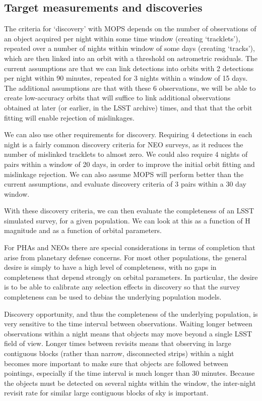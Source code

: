 
\subsection{Target measurements and discoveries}
\label{sec:\secname:targets}

The criteria for `discovery' with MOPS depends on the number
of observations of an object acquired per night within some time
window (creating `tracklets'), repeated over a number of nights within window of some
days (creating `tracks'), which are then linked into an orbit with a threshold on
astrometric residuals. The current assumptions are that we can link
detections into orbits with 2 detections per night within 90 minutes,
repeated for 3 nights within a window of 15 days. The additional assumptions are
that with these 6 observations, we will be able to create low-accuracy orbits that will suffice to link
additional observations obtained at later (or earlier, in the LSST
archive) times, and that that the orbit fitting will enable rejection
of mislinkages.

We can also use other requirements for discovery. Requiring 4
detections in each night is a fairly common discovery criteria for
NEO surveys, as it reduces the number of mislinked tracklets to almost
zero. We could also require 4 nights of pairs within a window of 20 days, in order to improve the
initial orbit fitting and mislinkage rejection. We can also assume
MOPS will perform better than the current assumptions, and evaluate
discovery criteria of 3 pairs within a 30 day window.

With these discovery criteria, we can then evaluate the completeness
of an LSST simulated survey, for a given population. We can look at
this as a function of H magnitude and as a function of orbital
parameters.

For PHAs and NEOs there are special considerations in terms of
completion that arise from planetary defense concerns. For most other
populations, the general desire is simply to have a high level of
completeness, with no gaps in completeness that depend strongly on
orbital parameters. In particular, the desire is to be able to
calibrate any selection effects in discovery so that the survey completeness can
be used to debias the underlying population models.

Discovery opportunity, and thus the completeness of the underlying
population, is very sensitive to the time interval between
observations. Waiting longer between observations within a night means that objects
may move beyond a single LSST field of view. Longer times between
revisits means that observing in large contiguous blocks (rather than
narrow, disconnected strips) within a night becomes more important to make sure that
objects are followed between pointings, especially if the time
interval is much longer than 30 minutes. Because the objects must be
detected on several nights within the window, the inter-night revisit
rate for similar large contiguous blocks of sky is important.

